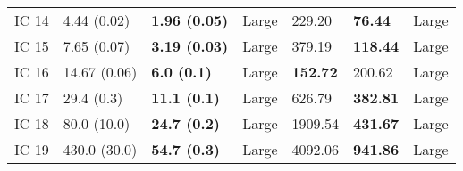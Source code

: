 \begin{tabular}{lllllll}
 IC 14 &       4.44 (0.02) &    \textbf{1.96 (0.05)} &       Large &                  229.20 &           \textbf{76.44} &       Large \\
 IC 15 &       7.65 (0.07) &    \textbf{3.19 (0.03)} &       Large &                  379.19 &          \textbf{118.44} &       Large \\
 IC 16 &      14.67 (0.06) &      \textbf{6.0 (0.1)} &       Large &         \textbf{152.72} &                   200.62 &       Large \\
 IC 17 &        29.4 (0.3) &     \textbf{11.1 (0.1)} &       Large &                  626.79 &          \textbf{382.81} &       Large \\
 IC 18 &       80.0 (10.0) &     \textbf{24.7 (0.2)} &       Large &                 1909.54 &          \textbf{431.67} &       Large \\
 IC 19 &      430.0 (30.0) &     \textbf{54.7 (0.3)} &       Large &                 4092.06 &          \textbf{941.86} &       Large \\
\bottomrule
\end{tabular}
